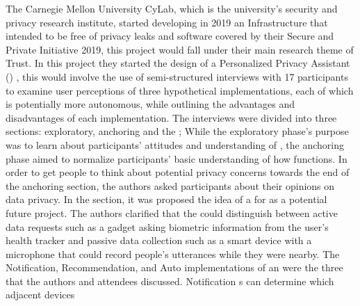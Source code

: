 The Carnegie Mellon University CyLab, which is the university's security
and privacy research institute, started developing in 2019 an \hyperlink{\acronym}{\acronym} Infrastructure
that intended to be free of privacy leaks and software covered by their
Secure and Private \hyperlink{\acronym}{\acronym} Initiative 2019, this project would fall under
their main research theme of Trust. In this project they started the design
of a Personalized Privacy Assistant (\hyperlink{\acronym}{\acronym}) \cite{ColnagoInforming}, this
would involve the use of semi-structured interviews with 17 participants
to examine user perceptions of three hypothetical \hyperlink{\acronym}{\acronym} implementations,
each of which is potentially more autonomous, while outlining the advantages
and disadvantages of each implementation. The interviews were divided into
three sections: exploratory, anchoring and the \hyperlink{\acronym}{\acronym}; While the exploratory
phase's purpose was to learn about participants' attitudes and understanding
of \hyperlink{\acronym}{\acronym}, the anchoring phase aimed to normalize participants' basic understanding
of how \hyperlink{\acronym}{\acronym} functions. In order to get people to think about potential privacy
concerns towards the end of the anchoring section, the authors asked participants
about their opinions on data privacy. In the \hyperlink{\acronym}{\acronym} section, it was proposed
the idea of a \hyperlink{\acronym}{\acronym} for \hyperlink{\acronym}{\acronym} as a potential future project. The authors clarified
that the \hyperlink{\acronym}{\acronym} could distinguish between active data requests such as a gadget
asking biometric information from the user's health tracker and passive
data collection such as a smart device with a microphone that could record
people's utterances while they were nearby. The Notification, Recommendation,
and Auto implementations of an \hyperlink{\acronym}{\acronym} \hyperlink{\acronym}{\acronym} were the three that the authors and
attendees discussed. Notification \hyperlink{\acronym}{\acronym}s can determine which adjacent devices
